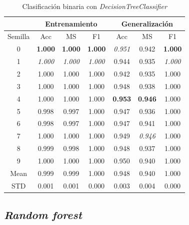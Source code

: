 \begin{table}[H]
	\centering
	\begin{tabular}{ |c|c|c|c|c|c|c| }
		\hline
		\rowcolor{LightCyan}
		 & \multicolumn{3}{c|}{Entrenamiento} & \multicolumn{3}{c|}{Generalización} \\
		\hline
		\rowcolor{LightCyan}
		 Semilla & Acc & MS & F1 & Acc & MS & F1 \\
		\hline
		0    & \textbf{1.000} & \textbf{1.000} & \textbf{1.000} & \textit{0.951} & 0.942          & \textbf{1.000} \\
		1    & \textit{1.000} & \textit{1.000} & \textit{1.000} & 0.944          & 0.935          & \textit{1.000} \\
		2    & 1.000          & 1.000          & 1.000          & 0.942          & 0.935          & 1.000          \\
		3    & 1.000          & 1.000          & 1.000          & 0.948          & 0.938          & 1.000          \\
		4    & 1.000          & 1.000          & 1.000          & \textbf{0.953} & \textbf{0.946} & 1.000          \\
		5    & 0.998          & 0.997          & 1.000          & 0.947          & 0.936          & 1.000          \\
		6    & 0.998          & 0.997          & 1.000          & 0.947          & 0.941          & 1.000          \\
		7    & 1.000          & 1.000          & 1.000          & 0.949          & \textit{0.946} & 1.000          \\
		8    & 0.999          & 0.998          & 1.000          & 0.948          & 0.937          & 1.000          \\
		9    & 1.000          & 1.000          & 1.000          & 0.950          & 0.940          & 1.000          \\
		Mean & 0.999          & 0.999          & 1.000          & 0.948          & 0.940          & 1.000          \\
		STD  & 0.001          & 0.001          & 0.000          & 0.003          & 0.004          & 0.000          \\
		\hline
	\end{tabular}
	\caption{Clasificación binaria con \textit{DecisionTreeClassifier}}
	\label{tabla:dt_bin}
\end{table}

\subsection{\textit{Random forest}}
\label{subsec:rf_bin}

